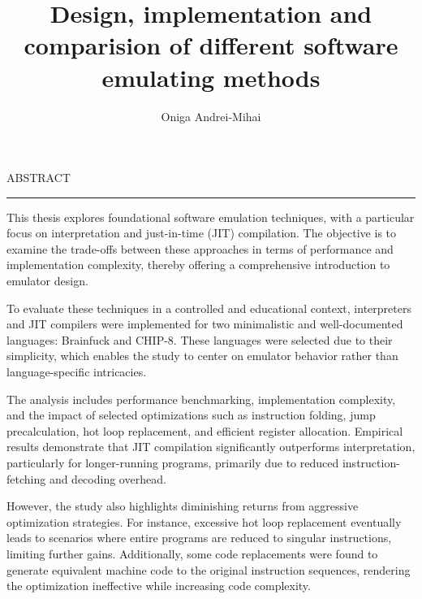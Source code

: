 \documentclass[12pt]{scrreport}
\begin{document}
\title{Design, implementation and comparision of different software emulating methods}					   
\author{Oniga Andrei-Mihai}											
				
\maketitle

\newpage
\thispagestyle{empty}
\mbox{}
\newpage
{}

\cleardoublepage
ABSTRACT
\vspace{0.5cm}	
\hrule
\vspace{0.5cm}
\par This thesis explores foundational software emulation techniques, with a particular focus on interpretation and just-in-time (JIT) compilation. The objective is to examine the trade-offs between these approaches in terms of performance and implementation complexity, thereby offering a comprehensive introduction to emulator design.

\par To evaluate these techniques in a controlled and educational context, interpreters and JIT compilers were implemented for two minimalistic and well-documented languages: Brainfuck and CHIP-8. These languages were selected due to their simplicity, which enables the study to center on emulator behavior rather than language-specific intricacies.

\par The analysis includes performance benchmarking, implementation complexity, and the impact of selected optimizations such as instruction folding, jump precalculation, hot loop replacement, and efficient register allocation. Empirical results demonstrate that JIT compilation significantly outperforms interpretation, particularly for longer-running programs, primarily due to reduced instruction-fetching and decoding overhead.

\par However, the study also highlights diminishing returns from aggressive optimization strategies. For instance, excessive hot loop replacement eventually leads to scenarios where entire programs are reduced to singular instructions, limiting further gains. Additionally, some code replacements were found to generate equivalent machine code to the original instruction sequences, rendering the optimization ineffective while increasing code complexity.
\end{document}
